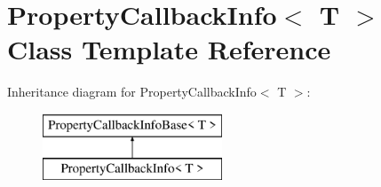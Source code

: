 \hypertarget{class_property_callback_info}{}\section{Property\+Callback\+Info$<$ T $>$ Class Template Reference}
\label{class_property_callback_info}
Inheritance diagram for Property\+Callback\+Info$<$ T $>$\+:\begin{figure}[H]
\begin{center}
\leavevmode
\includegraphics[height=2.000000cm]{class_property_callback_info}
\end{center}
\end{figure}
